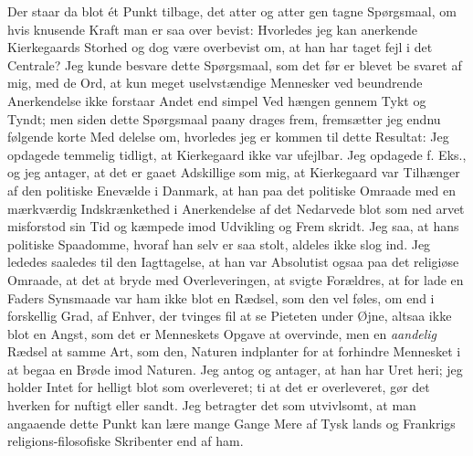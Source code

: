 \documentclass[12pt,a4paper,openany]{book}
\newcommand{\opage}[1]{\marginnote{\footnotesize\textit{[#1]}}}
\begin{document}
Der staar da blot ét Punkt tilbage, det atter og atter gen\-%
tagne Spørgsmaal, om hvis knusende Kraft man er saa over\-%
bevist: Hvorledes jeg kan anerkende Kierkegaards Storhed og
dog være overbevist om, at han har taget fejl i det Centrale?
Jeg kunde besvare dette Spørgsmaal, som det før er blevet be\-%
svaret af mig, med de Ord, at kun meget uselvstændige Mennesker
ved beundrende Anerkendelse ikke forstaar Andet end simpel Ved\-%
hængen gennem Tykt og Tyndt; men siden dette Spørgsmaal
paany drages frem, fremsætter jeg endnu følgende korte Med\-%
delelse om, hvorledes jeg er kommen til dette Resultat: Jeg
opdagede temmelig tidligt, at Kierkegaard ikke var ufejlbar. Jeg
opdagede f. Eks., og jeg antager, at det er gaaet Adskillige som
mig, at Kierkegaard var Tilhænger af den politiske Enevælde i
Danmark, at han paa det politiske Omraade med en mærkværdig
Indskrænkethed i Anerkendelse af det Nedarvede blot som ned\-%
arvet misforstod sin Tid og kæmpede imod Udvikling og Frem\-%
skridt. Jeg saa, at hans politiske Spaadomme, hvoraf han selv
er saa stolt, aldeles ikke slog ind. Jeg lededes saaledes til den
Iagttagelse, at han var Absolutist ogsaa paa det religiøse Omraade,
at det at bryde med Overleveringen, at svigte Forældres, at for\-%
lade en Faders Synsmaade var ham ikke blot en Rædsel, som
den vel føles, om end i forskellig Grad, af Enhver, der tvinges
fil at se Pieteten under Øjne, altsaa ikke blot en Angst, som
det er Menneskets Opgave at overvinde, men en \emph{aandelig} Rædsel
at samme Art, som den, Naturen indplanter for at forhindre
Mennesket i at begaa en Brøde imod Naturen. Jeg antog og
\opage{100}antager, at han har Uret heri; jeg holder Intet for helligt blot
som overleveret; ti at det er overleveret, gør det hverken for\-%
nuftigt eller sandt. Jeg betragter det som utvivlsomt, at man
angaaende dette Punkt kan lære mange Gange Mere af Tysk\-%
lands og Frankrigs religions-filosofiske Skribenter end af ham.
\end{document}
